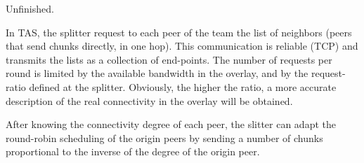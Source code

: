 
\label{sec:TAS}

\begin{note}
  Unfinished.
\end{note}

In TAS, the splitter request to each peer of the team the list of
neighbors (peers that send chunks directly, in one hop). This
communication is reliable (TCP) and transmits the lists as a
collection of end-points. The number of requests per round is limited
by the available bandwidth in the overlay, and by the request-ratio
defined at the splitter. Obviously, the higher the ratio, a more
accurate description of the real connectivity in the overlay will be
obtained.


After knowing the connectivity degree of each peer, the slitter can
adapt the round-robin scheduling of the origin peers by sending a
number of chunks proportional to the inverse of the degree of the
origin peer.

